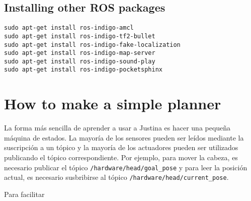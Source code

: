 \documentclass[letterpaper,10pt]{article}
\begin{document}
\subsection{Installing other ROS packages}
\begin{verbatim}
sudo apt-get install ros-indigo-amcl
sudo apt-get install ros-indigo-tf2-bullet
sudo apt-get install ros-indigo-fake-localization
sudo apt-get install ros-indigo-map-server
sudo apt-get install ros-indigo-sound-play
sudo apt-get install ros-indigo-pocketsphinx
\end{verbatim}

\begin{itemize}
\end{itemize}

\section{How to make a simple planner}
La forma más sencilla de aprender a usar a Justina es hacer una pequeña máquina de estados.
La mayoría de los  sensores pueden ser leídos mediante la suscripción a un tópico y la mayoría de los actuadores pueden ser utilizados publicando el tópico correspondiente. Por ejemplo, para mover la cabeza, es necesario publicar el tópico \texttt{/hardware/head/goal\_pose} y para leer la posición actual, es necesario susbribirse al tópico \texttt{/hardware/head/current\_pose}.

Para facilitar 



\end{document}
